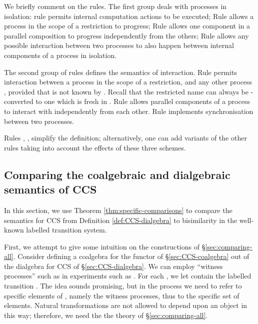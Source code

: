 \documentclass[orivec]{llncs}
\begin{document}
We briefly comment on the rules. The first group deals with processes in isolation: rule  permits internal computation actions to be executed; Rule  allows a process in the scope of a restriction to progress; Rule  allows one component in a parallel composition to progress independently from the others;  Rule  allows any possible interaction between two processes to also happen between internal components of a process in isolation.

The second group of rules defines the semantics of interaction. Rule  permits interaction between a process  in the scope of a restriction, and any other process , provided that  is not known by . Recall that the restricted name  can always be -converted to one which is fresh in . Rule  allows parallel components of a process  to interact with  independently from each other. Rule  implements synchronisation between two processes.

Rules , ,  simplify the definition; alternatively, one can add variants of the other rules taking into account the effects of these three schemes.





\subsection{Comparing the coalgebraic and dialgebraic semantics of CCS}
\label{sec:ccs-comparison}

In this section, we use Theorem \ref{thm:specific-comparisons} to compare the semantics for CCS from Definition \ref{def:CCS-dialgebra} to bisimilarity in the well-known labelled transition system. 

First, we attempt to give some intuition on the constructions of \S\ref{sec:comparing-all}. Consider defining a coalgebra  for the functor of \S \ref{sec:CCS-coalgebra} out of the dialgebra for CCS of \S \ref{sec:CCS-dialgebra}. We can employ ``witness processes'' such as  in experiments such as . For each  , we let  contain the labelled transition . The idea sounds promising, but in the process we need to refer to specific elements of , namely the witness processes, thus to the specific set  of elements. Natural transformations are not allowed to depend upon an object in this way; therefore, we need the the theory of \S \ref{sec:comparing-all}.
\end{document}
